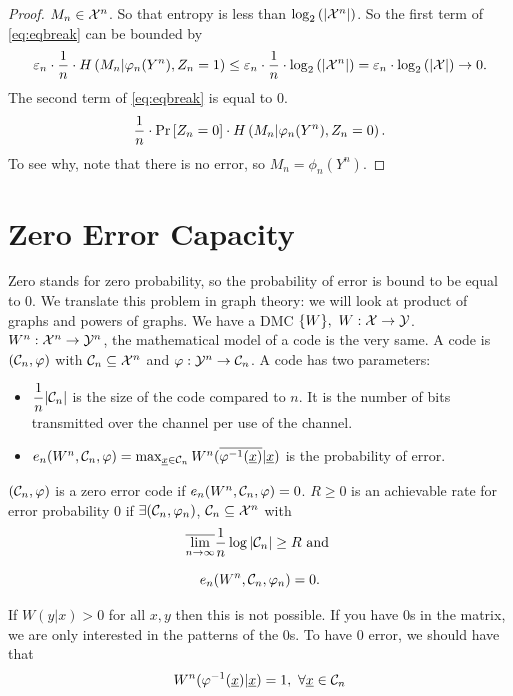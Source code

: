 \begin{proof}
	$M_n \in \mathcal{X}^n$.
	So that entropy is less than $\log_2 \left( {\left|{\mathcal{X}^n}\right|} \right)$.
	So the first term of \cref{eq:eqbreak} can be bounded by
	\begin{equation*}
		\varepsilon_n \cdot
		\frac{1}{n} \cdot
		H\left({M_n | \varphi_n(Y^n), Z_n = 1}\right) \le
		\varepsilon_n \cdot
		\frac{1}{n} \cdot
		\log_2 \left( {\left|{\mathcal{X}^n}\right|} \right) =
		\varepsilon_n \cdot \log_2 \left( {\left|{\mathcal{X}}\right|} \right) \to 0.
	\end{equation*}
	The second term of \cref{eq:eqbreak} is equal to 0.
	\begin{equation*}
		\frac{1}{n} \cdot \mathop{\mathrm{Pr}}\limits_{} \left[ {Z_n = 0} \right] \cdot H\left({M_n | \varphi_n(Y^n), Z_n = 0}\right).
	\end{equation*}
	To see why, note that there is no error, so $M_n = \phi_n(Y^n)$.
\end{proof}


\section{Zero Error Capacity}
Zero stands for zero probability, so the probability of error is bound to be equal to 0. We translate this problem in graph theory: we will look
at product of graphs and powers of graphs. We have a DMC $\{W\},\ W:\mathcal{X} \rightarrow \mathcal{Y}$. $W^n:\mathcal{X}^n \rightarrow \mathcal{Y}^n$, the mathematical model of a code is the very same. A code is $(\mathcal{C}_n, \varphi)$ with $\mathcal{C}_n \subseteq \mathcal{X}^n$ and $\varphi: \mathcal{Y}^n \rightarrow \mathcal{C}_n$. A code has two parameters:

\begin{itemize}
	\item $\dfrac{1}{n}|\mathcal{C}_n|$ is the size of the code compared to $n$. It is the number of bits transmitted over the channel per use of the channel.
	\item $e_n(W^n, \mathcal{C}_n, \varphi) = \max_{\underline{x} \in \mathcal{C}_n} W^n(\overline{\varphi^{-1}(\underline{x})}|\underline{x})$ is the probability of error.
\end{itemize}

$(\mathcal{C}_n, \varphi)$ is a zero error code if $e_n(W^n, \mathcal{C}_n, \varphi)=0$. $R \geq 0$ is an achievable rate for error probability $0$ if $\exists (\mathcal{C}_n, \varphi_n)$, $\mathcal{C}_n \subseteq \mathcal{X}^n$ with
\[
\overline{\lim_{n \rightarrow \infty}} \dfrac{1}{n}\log|\mathcal{C}_n| \geq R\text{ and }
\]

\[
e_n(W^n, \mathcal{C}_n, \varphi_n) = 0.
\]

If $W(y|x) > 0$ for all $x, y$ then this is not possible. If you have 0s in the matrix, we are only interested in the patterns of the 0s. To have 0 error, we should have that
\[
W^n(\phi^{-1}(\str{x})|\str{x}) = 1,\ \forall\str{x} \in \C_n
\]

